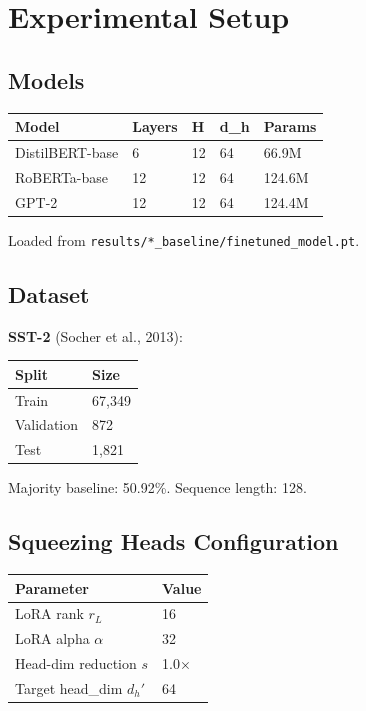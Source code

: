 
\section{Experimental Setup}

\subsection{Models}

\begin{table}[H]
\centering
\small
\begin{tabular}{lllll}
\toprule
\textbf{Model} & \textbf{Layers} & \textbf{H} & \textbf{d\_h} & \textbf{Params} \\
\midrule
DistilBERT-base & 6 & 12 & 64 & 66.9M \\
RoBERTa-base & 12 & 12 & 64 & 124.6M \\
GPT-2 & 12 & 12 & 64 & 124.4M \\
\bottomrule
\end{tabular}
\end{table}

Loaded from \texttt{results/*\_baseline/finetuned\_model.pt}.

\subsection{Dataset}

\textbf{SST-2} (Socher et al., 2013):

\begin{table}[H]
\centering
\small
\begin{tabular}{ll}
\toprule
\textbf{Split} & \textbf{Size} \\
\midrule
Train & 67,349 \\
Validation & 872 \\
Test & 1,821 \\
\bottomrule
\end{tabular}
\end{table}

Majority baseline: 50.92\%. Sequence length: 128.

\subsection{Squeezing Heads Configuration}

\begin{table}[H]
\centering
\small
\begin{tabular}{ll}
\toprule
\textbf{Parameter} & \textbf{Value} \\
\midrule
LoRA rank $r_L$ & 16 \\
LoRA alpha $\alpha$ & 32 \\
Head-dim reduction $s$ & 1.0$\times$ \\
Target head\_dim $d_h'$ & 64 \\
\bottomrule
\end{tabular}
\end{table}

